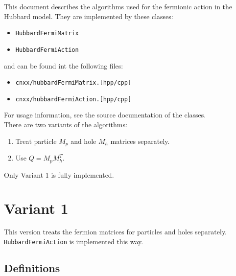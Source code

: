 \documentclass[a4paper, fleqn, twoside, notitlepage]{scrartcl}
\begin{document}
\maketitle
\tableofcontents

\vfill
\vspace{1em}
\noindent
This document describes the algorithms used for the fermionic action in the Hubbard model.
They are implemented by these classes:
\begin{itemize}
\item \texttt{HubbardFermiMatrix}
\item \texttt{HubbardFermiAction}
\end{itemize}
and can be found int the following files:
\begin{itemize}
\item \texttt{cnxx/hubbardFermiMatrix.[hpp/cpp]}
\item \texttt{cnxx/hubbardFermiAction.[hpp/cpp]}
\end{itemize}
For usage information, see the source documentation of the classes.\\

\noindent
There are two variants of the algorithms:
\begin{enumerate}
\item Treat particle $M_p$ and hole $M_h$ matrices separately.
\item Use $Q = M_p M_h^T$.
\end{enumerate}
Only Variant 1 is fully implemented.

\clearpage
\section{Variant 1}

This version treats the fermion matrices for particles and holes separately.
\texttt{HubbardFermiAction} is implemented this way.

\subsection{Definitions}
\end{document}
